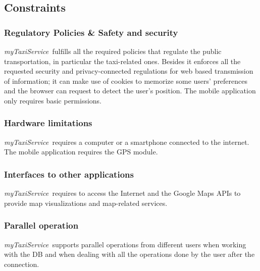 \documentclass[a4paper,11pt]{report} %
\newcommand{\mts}{\mbox{\normalfont\itshape myTaxiService\ }}
\begin{document}
	\subsection{Constraints}
	
	\subsubsection{Regulatory Policies \& Safety and security} \mts fulfills all the required policies that regulate the public transportation, in particular the taxi-related ones. Besides it enforces all the requested security and privacy-connected regulations for web based transmission of information; it can make use of cookies to memorize some users' preferences and the browser can request to detect the user's position. The mobile application only requires basic permissions. 
	
	\subsubsection{Hardware limitations} \mts requires a computer or a smartphone connected to the internet. The mobile application requires the GPS module.   
	
	\subsubsection{Interfaces to other applications} \mts requires to access the Internet and the Google Maps APIs to provide map visualizations and map-related services.
	
	\subsubsection{Parallel operation} \mts supports parallel operations from different users when working with the DB and when dealing with all the operations done by the user after the connection.
	
\end{document}
